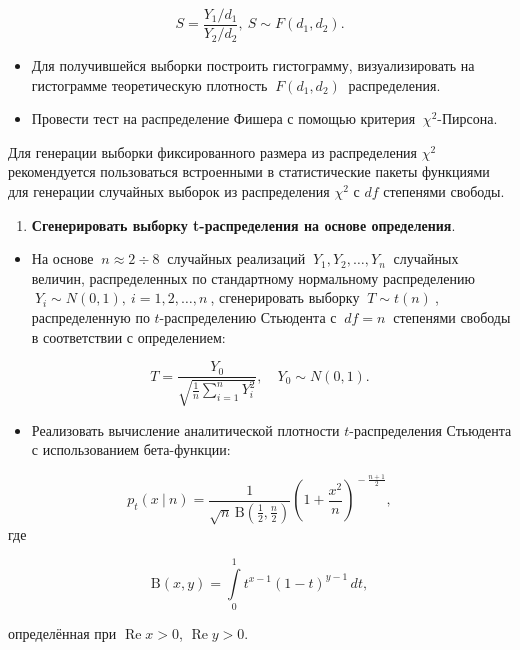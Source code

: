 \documentclass[
]{article}
\providecommand{\tightlist}{%
  \setlength{\itemsep}{0pt}\setlength{\parskip}{0pt}}
\begin{document}
\[
S = \frac{Y_1 / d_1}{Y_2 / d_2}, \ S\sim F(d_1, d_2).
\]

\begin{itemize}
\item
  Для получившейся выборки построить гистограмму, визуализировать на
  гистограмме теоретическую плотность \(\ F(d_1, d_2)\ \) распределения.
\item
  Провести тест на распределение Фишера с помощью критерия
  \(\ \chi^2\)-Пирсона.
\end{itemize}

Для генерации выборки фиксированного размера из распределения \(\chi^2\)
рекомендуется пользоваться встроенными в статистические пакеты функциями
для генерации случайных выборок из распределения \(\chi^2\) с \(df\)
степенями свободы.

\begin{enumerate}
\def\labelenumi{\arabic{enumi}.}
\setcounter{enumi}{3}
\tightlist
\item
  \textbf{Сгенерировать выборку t-распределения на основе определения}.
\end{enumerate}

\begin{itemize}
\tightlist
\item
  На основе \(\ n \approx 2\div 8\ \) случайных реализаций
  \(\ Y_1, Y_2, \dots, Y_n\ \) случайных величин, распределенных по
  стандартному нормальному распределению
  \(\ Y_i \sim N(0, 1), \ i = 1, 2, \dots, n\ \), сгенерировать выборку
  \(\ T \sim t(n)\ \), распределенную по \(t\)-распределению Стьюдента с
  \(\ df = n\ \) степенями свободы в соответствии с определением:
\end{itemize}

\[
T = \frac{Y_0}{\sqrt{\frac{1}{n} \sum_{i=1}^{n} Y_i^2}}, \quad Y_0 \sim N(0, 1).
\]

\begin{itemize}
\tightlist
\item
  Реализовать вычисление аналитической плотности \(t\)-распределения
  Стьюдента с использованием бета-функции:
\end{itemize}

\[
{\displaystyle p_{t}(x\ |\ n)={\frac {1}{{\sqrt {n}}\,\mathrm {B} ({\frac {1}{2}},{\frac {n}{2}})}}\left(1+{\frac {x^{2}}{n}}\right)^{\!-{\frac {n+1}{2}}}},
\] где

\[
{\displaystyle \mathrm {B} (x,y)=\int \limits _{0}^{1}t^{x-1}(1-t)^{y-1}\,dt,}
\]

определённая при \({\displaystyle \operatorname {Re} x>0}\),
\({\displaystyle \operatorname {Re} y>0}\).
\end{document}
